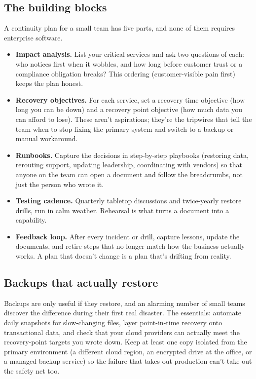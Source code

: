 \subsection{The building blocks}


A continuity plan for a small team has five parts, and none of them requires enterprise software.


\begin{itemize}[leftmargin=*]
\item \textbf{Impact analysis.} List your critical services and ask two questions of each: who notices first when it wobbles, and how long before customer trust or a compliance obligation breaks? This ordering (customer-visible pain first) keeps the plan honest.
\item \textbf{Recovery objectives.} For each service, set a recovery time objective (how long you can be down) and a recovery point objective (how much data you can afford to lose). These aren't aspirations; they're the tripwires that tell the team when to stop fixing the primary system and switch to a backup or manual workaround.
\item \textbf{Runbooks.} Capture the decisions in step-by-step playbooks (restoring data, rerouting support, updating leadership, coordinating with vendors) so that anyone on the team can open a document and follow the breadcrumbs, not just the person who wrote it.
\item \textbf{Testing cadence.} Quarterly tabletop discussions and twice-yearly restore drills, run in calm weather. Rehearsal is what turns a document into a capability.
\item \textbf{Feedback loop.} After every incident or drill, capture lessons, update the documents, and retire steps that no longer match how the business actually works. A plan that doesn't change is a plan that's drifting from reality.
\end{itemize}


\subsection{Backups that actually restore}


Backups are only useful if they restore, and an alarming number of small teams discover the difference during their first real disaster. The essentials: automate daily snapshots for slow-changing files, layer point-in-time recovery onto transactional data, and check that your cloud providers can actually meet the recovery-point targets you wrote down. Keep at least one copy isolated from the primary environment (a different cloud region, an encrypted drive at the office, or a managed backup service) so the failure that takes out production can't take out the safety net too.


